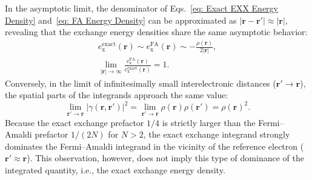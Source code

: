 \documentclass[%
 reprint,
 amsmath,amssymb,
 aps,
pra,
]{revtex4-2}
\begin{document}
In the asymptotic limit, the denominator of Eqs.~\eqref{eq: Exact EXX Energy Density} and~\eqref{eq: FA Energy Density} can be approximated as $|\mathbf{r}-\mathbf{r}'| \approx |\mathbf{r}|$, revealing that the exchange energy densities share the same asymptotic behavior:
\begin{gather}
    e_{\text{x}}^{\text{exact}}(\mathbf{r})
    \sim
    e_{\text{x}}^{\text{FA}}(\mathbf{r})
    \sim
    -
    \frac{\rho(\mathbf{r})}{2|\mathbf{r}|},\\[10pt]
    \lim_{|\mathbf{r}|\to\infty}
    \frac
    {e_{\text{x}}^{\text{FA}}(\mathbf{r})}
    {e_{\text{x}}^{\text{exact}}(\mathbf{r})}
    =
    1.
\end{gather}
Conversely, in the limit of infinitesimally small interelectronic distances ($\mathbf{r}' \to \mathbf{r}$), the spatial parts of the integrands approach the same value:
\begin{equation}
    \lim_{\mathbf{r}' \to \mathbf{r}}
    |\gamma(\mathbf{r},\mathbf{r}')|^2
    =
    \lim_{\mathbf{r}' \to \mathbf{r}}
    \rho(\mathbf{r})\rho(\mathbf{r}')
    =
    \rho(\mathbf{r})^2.
\end{equation}
Because the exact exchange prefactor $1/4$ is strictly larger than the Fermi--Amaldi prefactor $1/(2N)$ for $N>2$, the exact exchange integrand strongly dominates the Fermi--Amaldi integrand in the vicinity of the reference electron ($\mathbf{r}' \approx \mathbf{r}$). This observation, however, does not imply this type of dominance of the integrated quantity, i.e., the exact exchange energy density.


\end{document}
